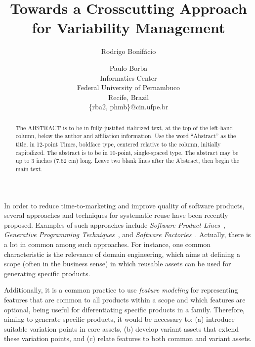 \documentclass[times, 11pt,twocolumn]{article}
\begin{document}
\title{Towards a Crosscutting Approach for Variability Management}

\author{Rodrigo Bonif\'{a}cio \and Paulo Borba\\
Informatics Center \\ Federal University of Pernambuco \\ Recife, Brazil \\
\{rba2, phmb\}@cin.ufpe.br\\ }

\maketitle
\thispagestyle{empty}

\begin{abstract}
   The ABSTRACT is to be in fully-justified italicized text, at the top 
   of the left-hand column, below the author and affiliation 
   information. Use the word ``Abstract'' as the title, in 12-point 
   Times, boldface type, centered relative to the column, initially 
   capitalized. The abstract is to be in 10-point, single-spaced type. 
   The abstract may be up to 3 inches (7.62 cm) long. Leave two blank 
   lines after the Abstract, then begin the main text. 
\end{abstract}




In order to reduce time-to-marketing and improve quality of software products,
several approaches and techniques for systematic reuse have been recently
proposed. Examples of such approaches include \emph{Software Product
Lines}~\cite{Pohl:2005aa, Clements:2001aa}, \emph{Generative Programming
Techniques}~\cite{Czarnecki:2000aa}, and \emph{Software
Factories}~\cite{Greenfield:2003aa}. Actually, there is a lot in common among
such approaches. For instance, one common characteristic is the relevance of
domain engineering, which aims at defining a scope (often in the business sense)
in which reusable assets can be used for generating specific products.

Additionally, it is a common practice to use \emph{feature modeling} for
representing features that are common to all products within a scope and which
features are optional, being useful for diferentiating specific products in a
family. Therefore, aiming to generate specific products, it would be necessary
to: (a) introduce suitable variation points in core assets, (b) develop variant assets
that extend these variation points, and (c) relate features to both common and
variant assets.
\end{document}
